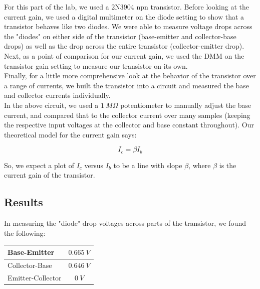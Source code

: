 \documentclass[11pt]{article}
\begin{document}
For this part of the lab, we used a 2N3904 npn transistor. Before looking at the current gain, we used a digital multimeter on the diode setting to show that a transistor behaves like two diodes. We were able to measure voltage drops across the "diodes" on either side of the transistor (base-emitter and collector-base drops) as well as the drop across the entire transistor (collector-emitter drop).\\

Next, as a point of comparison for our current gain, we used the DMM on the transistor gain setting to measure our transistor on its own.\\

Finally, for a little more comprehensive look at the behavior of the transistor over a range of currents, we built the transistor into a circuit and measured the base and collector currents individually.\\

In the above circuit, we used a $1\ M \Omega$ potentiometer to manually adjust the base current, and compared that to the collector current over many samples (keeping the respective input voltages at the collector and base constant throughout). Our theoretical model for the current gain says:

\begin{equation}
I_c = \beta I_b
\end{equation} 

So, we expect a plot of $I_c$ versus $I_b$ to be a line with slope $\beta$, where $\beta$ is the current gain of the transistor.\\

\subsection{Results}

In measuring the "diode" drop voltages across parts of the transistor, we found the following: \\

\begin{center}
    \begin{tabular}[H]{ | l | c | }
        \hline
        Base-Emitter & $0.665\ V$ \\ \hline
        Collector-Base & $0.646\ V$ \\ \hline
        Emitter-Collector & $0\ V$ \\ \hline
    \end{tabular}
\end{center}
\end{document}
